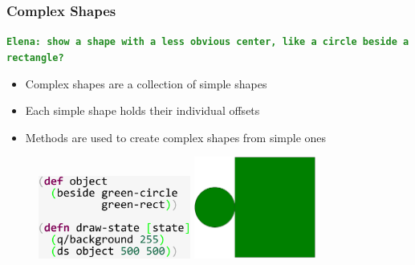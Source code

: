 \documentclass{beamer}
\newcommand{\comment}[1]{{\bf \tt  {#1}}}
\newcommand{\emcomment}[1]{\textcolor{ForestGreen}{\comment{Elena: {#1}}}}
\begin{document}
\begin{frame}
\frametitle{Complex Shapes}
\emcomment{show a shape with a less obvious center, like a circle beside a rectangle?} 
	\begin{itemize}
		\item Complex shapes are a collection of simple shapes
		\item Each simple shape holds their individual offsets
		\item Methods are used to create complex shapes from simple ones
	\end{itemize}
	\begin{figure}
	\includegraphics[width=5cm]{PresentationImages/greenCircleRectangleCode.pdf}
	\hspace{1cm}
	\includegraphics[width=4cm]{PresentationImages/greenCircleRectangle.pdf}
	\end{figure}
\end{frame}
\end{document}
